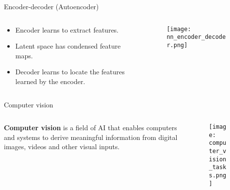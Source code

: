 \documentclass[10pt,aspectratio=169,dvipsnames]{beamer} %
\begin{document}
	\setcounter{subfigure}{0}
	\begin{frame}{Encoder-decoder (Autoencoder)}
		\begin{columns}[T]
			\begin{column}[t]{.35\textwidth}
				\begin{itemize}
					\item \alert{Encoder} learns to extract features.
					\item \alert{Latent space} has condensed feature maps.
					\item \alert{Decoder} learns to locate the features learned by the encoder.
				\end{itemize}	
			\end{column}
			\hfill
			\begin{column}[t]{.6\textwidth}
				\begin{figure}
					\centering
					\texttt{[image: nn\_encoder\_decoder.png]}
				\end{figure}	
			\end{column}
		\end{columns}			
	\end{frame}
	\setcounter{subfigure}{0}
	\begin{frame}{Computer vision}
		\begin{columns}[T]
			\begin{column}[c]{0.27\textwidth}
				\justifying
				\alert {\textbf{Computer vision}} is a field of AI that enables computers and systems to derive meaningful information from digital images, videos and other visual inputs. 
			\end{column}
			\quad
			\begin{column}[c]{0.7\textwidth}
				\begin{figure}
					\centering
					\texttt{[image: computer\_vision\_tasks.png]}
				\end{figure}
			\end{column}
		\end{columns}
	\end{frame}
\end{document}
